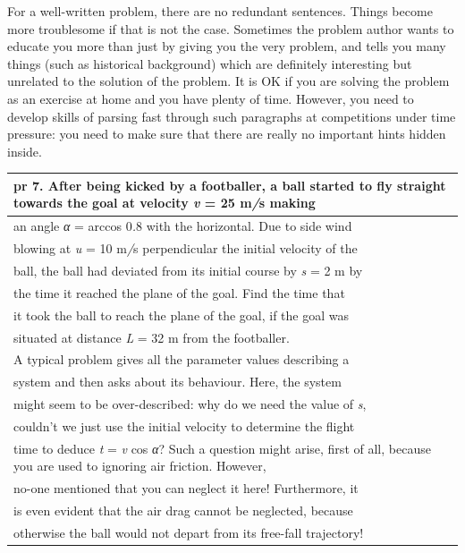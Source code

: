 \documentclass[
]{article}
\begin{document}
For a well-written problem, there are no redundant sentences. Things
become more troublesome if that is not the case. Sometimes the problem
author wants to educate you more than just by giving you the very
problem, and tells you many things (such as historical background) which
are deﬁnitely interesting but unrelated to the solution of the problem.
It is OK if you are solving the problem as an exercise at home and you
have plenty of time. However, you need to develop skills of parsing fast
through such paragraphs at competitions under time pressure: you need to
make sure that there are really no important hints hidden inside.

\begin{longtable}[]{@{}l@{}}
\toprule
\textbf{pr 7.} After being kicked by a footballer, a ball started to ﬂy
straight towards the goal at velocity \emph{v} = 25 m\emph{/}s making \\
\midrule
\endhead
an angle \emph{α} = arccos 0\emph{.}8 with the horizontal. Due to side
wind \\
blowing at \emph{u} = 10 m\emph{/}s perpendicular the initial velocity
of the \\
ball, the ball had deviated from its initial course by \emph{s} = 2 m
by \\
the time it reached the plane of the goal. Find the time that \\
it took the ball to reach the plane of the goal, if the goal was \\
situated at distance \emph{L} = 32 m from the footballer. \\
A typical problem gives all the parameter values describing a \\
system and then asks about its behaviour. Here, the system \\
might seem to be over-described: why do we need the value of
\emph{s}, \\
couldn't we just use the initial velocity to determine the ﬂight \\
time to deduce \emph{t} = \emph{v} cos \emph{α}? Such a question might
arise, ﬁrst of all, because you are used to ignoring air friction.
However, \\
no-one mentioned that you can neglect it here! Furthermore, it \\
is even evident that the air drag cannot be neglected, because \\
otherwise the ball would not depart from its free-fall trajectory! \\
\bottomrule
\end{longtable}
\end{document}
